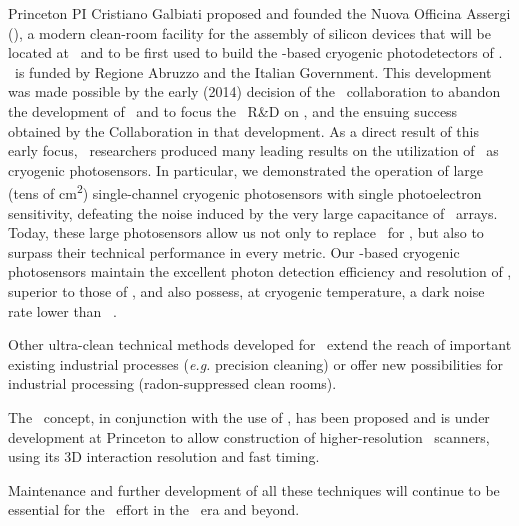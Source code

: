 \begin{compactitem}
\item Princeton PI Cristiano Galbiati proposed and founded the Nuova Officina Assergi (\NOA), a modern clean-room facility for the assembly of silicon devices that will be located at \LNGS\ and to be first used to build the \SiPM-based cryogenic photodetectors of \DSks.  \NOA\ is funded by Regione Abruzzo and the Italian Government.  This development was made possible by the early (2014) decision of the \DSs\ collaboration to abandon the development of \PMTs\ and to focus the \DSs\ R\&D on \SiPMs, and the ensuing success obtained by the Collaboration in that development.  As a direct result of this early focus, \DSs\ researchers produced many leading results on the utilization of \SiPMs\ as cryogenic photosensors.  In particular, we demonstrated the operation of large (tens of \si{\square\cm}) single-channel cryogenic photosensors with single photoelectron sensitivity, defeating the noise induced by the very large capacitance of \SiPMs\ arrays.  Today, these large photosensors allow us not only to replace \PMTs\ for \DSks, but also to surpass their technical performance in every metric.  Our \SiPM-based cryogenic photosensors maintain the excellent photon detection efficiency and resolution of \SiPMs, superior to those of \PMTs, and also possess, at cryogenic temperature, a dark noise rate lower than \PMTs~\cite{Dincecco:2017tj}.

\item Other ultra-clean technical methods developed for \DSfs\ extend the reach of important existing industrial processes ({\it e.g.} precision cleaning) or offer new possibilities for industrial processing (radon-suppressed clean rooms).

\item The \LArTPC\ concept, in conjunction with the use of \SiPMs, has been proposed and is under development at Princeton to allow construction of higher-resolution \PET\ scanners, using its 3D interaction resolution and fast timing.

\end{compactitem}

Maintenance and further development of all these techniques will continue to be essential for the \GADMC\ effort in the \DSks\ era and beyond.
